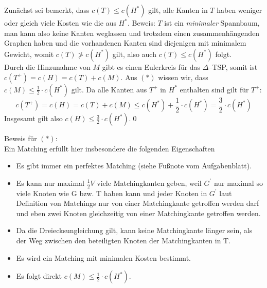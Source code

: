 \documentclass[a4paper]{article}
\begin{document}
	\maketitle
	\section{}
		Zunächst sei bemerkt, dass $c(T)\leq c(H^*)$ gilt, alle Kanten in $T$ haben weniger oder gleich viele Kosten wie die aus $H^*$.\n
		Beweis: $T$ ist ein \textit{minimaler} Spannbaum, man kann also keine Kanten weglassen und trotzdem einen zusammenhängenden Graphen haben und die vorhandenen Kanten sind diejenigen mit minimalem Gewicht, womit $c(T)\not> c(H^*)$ gilt, also auch $c(T)\leq c(H^*)$ folgt.\\
		Durch die Hinzunahme von $M$ gibt es einen Eulerkreis für das $\Delta$--TSP, somit ist $c(T^+)=c(H)=c(T)+c(M)$.
		Aus $(*)$ wissen wir, dass $c(M)\leq \frac{1}{2}\cdot c(H^*)$ gilt.
		Da alle Kanten aus $T^+$ in $H^*$ enthalten sind gilt für $T^+$:
		\[c(T^+)=c(H)=c(T)+c(M)\leq c(H^*)+\frac{1}{2}\cdot c(H^*)=\frac{3}{2}\cdot c(H^*)\]
		Insgesamt gilt also $c(H)\leq \frac{3}{2}\cdot c(H^*)$.\qed
		
		Beweis für $(*)$: \\
		Ein Matching erfüllt hier insbesondere die folgenden Eigenschaften
		\begin{itemize}
		\item Es gibt immer ein perfektes Matching (siehe Fußnote vom Aufgabenblatt).
		\item Es kann nur maximal $\frac{1}{2}V$ viele Matchingkanten geben, weil $G^\prime$ nur maximal so viele Knoten wie G bzw. T haben kann und jeder Knoten in $G^\prime$ laut Definition von Matchings nur von einer Matchingkante getroffen werden darf und eben zwei Knoten gleichzeitig von einer Matchingkante getroffen werden.
		\item Da die Dreiecksungleichung gilt, kann keine Matchingkante länger sein, als der Weg zwischen den beteiligten Knoten der Matchingkanten in T. 
		\item Es wird ein Matching mit minimalen Kosten bestimmt.
		\item Es folgt direkt $c(M)\leq \frac{1}{2}\cdot c(H^*)$.
		\end{itemize}
		
		\newpage
		
\end{document}
